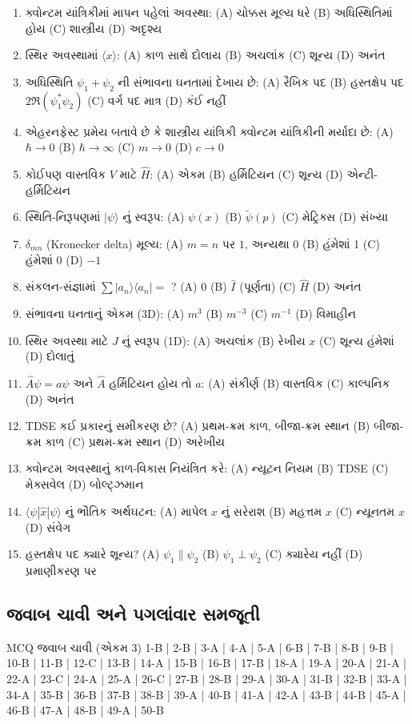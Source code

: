 \begin{enumerate}[label=\textbf{\arabic*.}]
  \item ક્વોન્ટમ યાંત્રિકીમાં માપન પહેલાં અવસ્થા: (A) ચોક્કસ મૂલ્ય ધરે (B) અધિસ્થિતિમાં હોય (C) શાસ્ત્રીય (D) અદૃશ્ય
  \item સ્થિર અવસ્થામાં $\langle x\rangle$: (A) કાળ સાથે દોલાય (B) અચલાંક (C) શૂન્ય (D) અનંત
  \item અધિસ્થિતિ $\psi_1+\psi_2$ ની સંભાવના ઘનતામાં દેખાય છે: (A) રૈખિક પદ (B) હસ્તક્ષેપ પદ $2\Re(\psi_1^{*}\psi_2)$ (C) વર્ગ પદ માત્ર (D) કંઈ નહીં
  \item એહરનફેસ્ટ પ્રમેય બતાવે છે કે શાસ્ત્રીય યાંત્રિકી ક્વોન્ટમ યાંત્રિકીની મર્યાદા છે: (A) $\hbar\to0$ (B) $\hbar\to\infty$ (C) $m\to0$ (D) $c\to0$
  \item કોઈપણ વાસ્તવિક $V$ માટે $\hat H$: (A) એકમ (B) હર્મિટિયન (C) શૂન્ય (D) એન્ટી-હર્મિટિયન
  \item સ્થિતિ-નિરૂપણમાં $|\psi\rangle$ નું સ્વરૂપ: (A) $\psi(x)$ (B) $\tilde\psi(p)$ (C) મેટ્રિક્સ (D) સંખ્યા
  \item $\delta_{mn}$ (Kronecker delta) મૂલ્ય: (A) $m=n$ પર $1$, અન્યથા $0$ (B) હંમેશાં 1 (C) હંમેશાં 0 (D) $-1$
  \item સંકલન-સંજ્ઞામાં $\sum|a_n\rangle\langle a_n|=$ ? (A) $0$ (B) $\hat I$ (પૂર્ણતા) (C) $\hat H$ (D) અનંત
  \item સંભાવના ઘનતાનું એકમ (3D): (A) $m^{3}$ (B) $m^{-3}$ (C) $m^{-1}$ (D) વિમાહીન
  \item સ્થિર અવસ્થા માટે $J$ નું સ્વરૂપ (1D): (A) અચલાંક (B) રેખીય $x$ (C) શૂન્ય હંમેશાં (D) દોલાતું
  \item $\hat A\psi=a\psi$ અને $\hat A$ હર્મિટિયન હોય તો $a$: (A) સંકીર્ણ (B) વાસ્તવિક (C) કાલ્પનિક (D) અનંત
  \item TDSE કઈ પ્રકારનું સમીકરણ છે? (A) પ્રથમ-ક્રમ કાળ, બીજા-ક્રમ સ્થાન (B) બીજા-ક્રમ કાળ (C) પ્રથમ-ક્રમ સ્થાન (D) અરેખીય
  \item ક્વોન્ટમ અવસ્થાનું કાળ-વિકાસ નિયંત્રિત કરે: (A) ન્યૂટન નિયમ (B) TDSE (C) મેક્સવેલ (D) બોલ્ટ્ઝમાન
  \item $\langle\psi|\hat x|\psi\rangle$ નું ભૌતિક અર્થઘટન: (A) માપેલ $x$ નું સરેરાશ (B) મહત્તમ $x$ (C) ન્યૂનતમ $x$ (D) સંવેગ
  \item હસ્તક્ષેપ પદ ક્યારે શૂન્ય? (A) $\psi_1\parallel\psi_2$ (B) $\psi_1\perp\psi_2$ (C) ક્યારેય નહીં (D) પ્રમાણીકરણ પર
\end{enumerate}

\subsection*{જવાબ ચાવી અને પગલાંવાર સમજૂતી}
\begin{javabchavi}{MCQ જવાબ ચાવી (એકમ 3)}
1-B | 2-B | 3-A | 4-A | 5-A | 6-B | 7-B | 8-B | 9-B | 10-B |
11-B | 12-C | 13-B | 14-A | 15-B | 16-B | 17-B | 18-A | 19-A | 20-A |
21-A | 22-A | 23-C | 24-A | 25-A | 26-C | 27-B | 28-B | 29-A | 30-A |
31-B | 32-B | 33-A | 34-A | 35-B | 36-B | 37-B | 38-B | 39-A | 40-B |
41-A | 42-A | 43-B | 44-B | 45-A | 46-B | 47-A | 48-B | 49-A | 50-B
\end{javabchavi}

